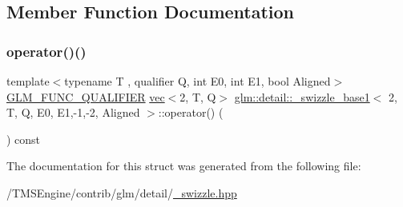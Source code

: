 \subsection{Member Function Documentation}
\mbox{\label{structglm_1_1detail_1_1__swizzle__base1_3_012_00_01_t_00_01_q_00_01_e0_00_01_e1_00-1_00-2_00_01_aligned_01_4_ae4bac86c7894c7c68590818deb920945}} 
\subsubsection{\texorpdfstring{operator()()}{operator()()}}
{\footnotesize\ttfamily template$<$typename T , qualifier Q, int E0, int E1, bool Aligned$>$ \\
\hyperlink{setup_8hpp_a33fdea6f91c5f834105f7415e2a64407}{G\+L\+M\+\_\+\+F\+U\+N\+C\+\_\+\+Q\+U\+A\+L\+I\+F\+I\+ER} \hyperlink{structglm_1_1vec}{vec}$<$2, T, Q$>$ \hyperlink{structglm_1_1detail_1_1__swizzle__base1}{glm\+::detail\+::\+\_\+swizzle\+\_\+base1}$<$ 2, T, Q, E0, E1,-\/1,-\/2, Aligned $>$\+::operator() (\begin{DoxyParamCaption}{ }\end{DoxyParamCaption}) const\hspace{0.3cm}{\ttfamily [inline]}}



The documentation for this struct was generated from the following file\+:\begin{DoxyCompactItemize}
\item 
/\+T\+M\+S\+Engine/contrib/glm/detail/\hyperlink{__swizzle_8hpp}{\+\_\+swizzle.\+hpp}\end{DoxyCompactItemize}
